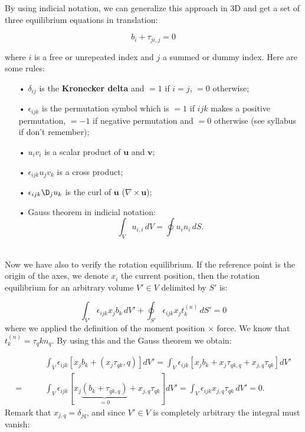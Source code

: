 		By using indicial notation, we can generalize this approach in 3D and get a set of three equilibrium equations in translation:
		
		\begin{equation}
		b_i + \tau _{ji,j} = 0
		\end{equation}
		
		where $i$ is a free or unrepeated index and $j$ a summed or dummy index. Here are some rules:
		
		\begin{itemize}
			\item[•] $\delta_{ij}$ is the \textbf{Kronecker delta} and $=1$ if $i=j$, $=0$ otherwise;
			
			\item[•] $\epsilon _{ijk}$ is the permutation symbol which is $=1$ if $ijk$ makes a positive permutation, $=-1$ if negative permutation and $=0$ otherwise (see syllabus if don't remember);
			
			\item[•] $u_iv_i$ is a scalar product of $\bm{u}$ and $\bm{v}$;
			\item[•] $\epsilon _{ijk} u_jv_k$ is a cross product;
			\item[•] $\epsilon _{ijk} \D _j u_k$ is the curl of $\bm{u}$ ($\nabla \times \bm{u}$);
			\item[•] Gauss theorem in indicial notation:
			\begin{equation}
			\int _V u_{i,i}\, dV = \oint u_i n_i \, dS.
			\end{equation}
\end{itemize}		 

			\ \\ Now we have also to verify the rotation equilibrium. If the reference point is the origin of the axes, we denote $x_i$ the current position, then the rotation equilibrium for an arbitrary volume $V' \in V$ delimited by $S'$ is:
			
			\begin{equation}
			\int _{V'} \epsilon _{ijk} x_j b_k\, dV' + \oint _{S'}\epsilon _{ijk} x_j t^{(n)}_k \, dS' = 0 
			\end{equation}
			where we applied the definition of the moment position $\times$ force. We know that $t^{(n)}_k = \tau _qk n_q$. By using this and the Gauss theorem we obtain:
			
			\begin{equation}
			\begin{aligned}
			&\int _V \epsilon _{ijk}\left[ x_j b_k + (x_j \tau _{qk},q)\right] dV' = \int _V \epsilon _{ijk}\left[ x_j b_k + x_j \tau _{qk,q} +x_{j,q} \tau _{qk} \right] dV'\\
			=\qquad &\int _V \epsilon _{ijk}\left[ x_j\underbrace{(b_k + \tau _{qk,q})}_{=0} +x_{j,q} \tau _{qk} \right] dV' = \int _V \epsilon _{ijk} x_{j,q} \tau _{qk} \, dV' = 0.
			\end{aligned}
			\end{equation}
			 Remark that $x_{j,q} = \delta _{jq}$, and since $V'\in V$ is completely arbitrary the integral must vanish:
			 
